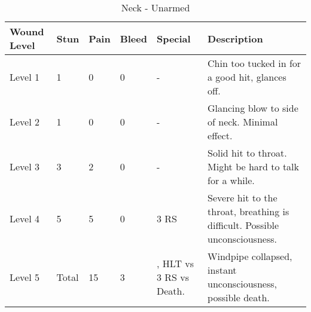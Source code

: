 \documentclass[oneside,11pt,english]{book}
\begin{document}
\begin{table}[!hb] %
	\caption{Neck - Unarmed}
	\label{wound:Neck - Unarmed}
	\begin{tabu} to 
Wound Level &Stun &Pain &Bleed &Special &Description\\\toprule
Level 1& 1& 0& 0& - &Chin too tucked in for a good hit, glances off.\\
Level 2& 1& 0& 0& - &Glancing blow to side of neck. Minimal effect.\\
Level 3& 3& 2& 0& - &Solid hit to throat. Might be hard to talk for a while.\\
Level 4& 5& 5& 0&  3 RS &Severe hit to the throat, breathing is difficult. Possible unconsciousness.\\
Level 5& Total &15 &3 
	&, \newline
		HLT vs 3 RS vs Death.
	&Windpipe collapsed, instant unconsciousness, possible death.\\
	\end{tabu}
\end{table}
	\clearpage
\end{document}
